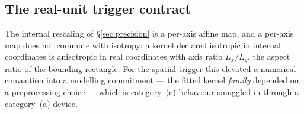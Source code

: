 
\subsection{The real-unit trigger contract}\label{sec:realunit-trigger}

The internal rescaling of \S\ref{sec:precision} is a per-axis affine map,
and a per-axis map does not commute with isotropy: a kernel declared
isotropic in internal coordinates is anisotropic in real coordinates with
axis ratio $L_x/L_y$, the aspect ratio of the bounding rectangle. For the
spatial trigger this elevated a numerical convention into a modelling
commitment --- the fitted kernel \emph{family} depended on a preprocessing
choice --- which is category~(c) behaviour smuggled in through a
category~(a) device.

